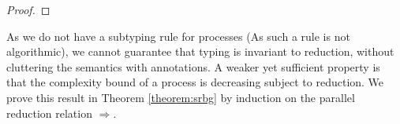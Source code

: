 \begin{lemma}
\begin{proof}
\end{proof}
\end{lemma}
%
As we do not have a subtyping rule for processes (As such a rule is not algorithmic), we cannot guarantee that typing is invariant to reduction, without cluttering the semantics with annotations. A weaker yet sufficient property is that the complexity bound of a process is decreasing subject to reduction. We prove this result in Theorem \ref{theorem:srbg} by induction on the parallel reduction relation $\Longrightarrow$. 
%
